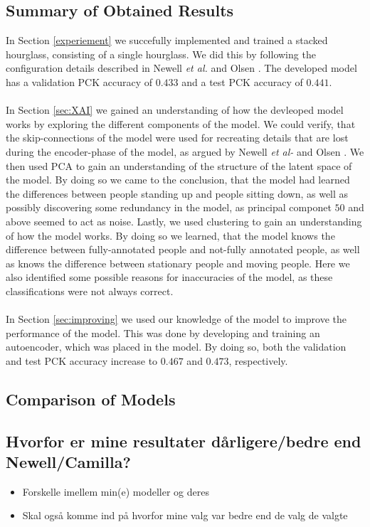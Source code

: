 \documentclass[./main.tex]{subfiles}
\begin{document}
\subsection{Summary of Obtained Results}
In Section \ref{experiement} we succefully implemented and trained a stacked hourglass, consisting of a single hourglass. We did this by following the configuration details described in Newell \textit{et al.} \cite{Newell} and Olsen \cite{Camilla}. The developed model has a validation PCK accuracy of $0.433$ and a test PCK accuracy of $0.441$.
\\
\\
In Section \ref{sec:XAI} we gained an understanding of how the devleoped model works by exploring the different components of the model. We could verify, that the skip-connections of the model were used for recreating details that are lost during the encoder-phase of the model, as argued by Newell \textit{et al-} \cite{Newell} and Olsen \cite{Camilla}. We then used PCA to gain an understanding of the structure of the latent space of the model. By doing so we came to the conclusion, that the model had learned the differences between people standing up and people sitting down, as well as possibly discovering some redundancy in the model, as principal componet $50$ and above seemed to act as noise. Lastly, we used clustering to gain an understanding of how the model works. By doing so we learned, that the model knows the difference between fully-annotated people and not-fully annotated people, as well as knows the difference between stationary people and moving people. Here we also identified some possible reasons for inaccuracies of the model, as these classifications were not always correct.
\\
\\
In Section \ref{sec:improving} we used our knowledge of the model to improve the performance of the model. This was done by developing and training an autoencoder, which was placed in the model. By doing so, both the validation and test PCK accuracy increase to $0.467$ and $0.473$, respectively.

\subsection{Comparison of Models}

\subsection{Hvorfor er mine resultater dårligere/bedre end Newell/Camilla?}
\begin{itemize}
    \item Forskelle imellem min(e) modeller og deres
    \item Skal også komme ind på hvorfor mine valg var bedre end de valg de valgte
\end{itemize}
\end{document}
